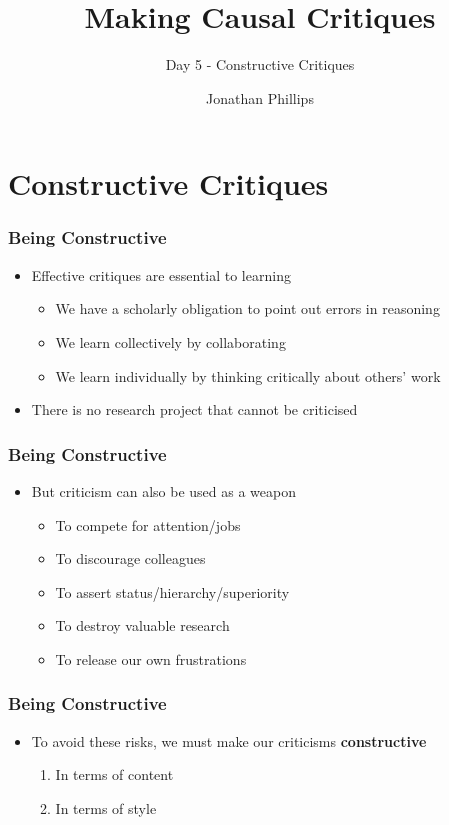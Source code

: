 \documentclass[xcolor=x11names,compress]{beamer}\usepackage[]{graphicx}\usepackage[]{color}
\title{Making Causal Critiques}
\subtitle{Day 5 - Constructive Critiques}
\author{Jonathan Phillips}
\renewcommand{\(}{\begin{columns}}
\renewcommand{\)}{\end{columns}}
\newcommand{\<}[1]{\begin{column}{#1}}
\renewcommand{\>}{\end{column}}
\begin{document}
\frame{\titlepage}

\section{Constructive Critiques}

\begin{frame}
\frametitle{Being Constructive}
\begin{itemize}
\item Effective critiques are essential to learning
\begin{itemize}
\item We have a scholarly obligation to point out errors in reasoning
\item We learn collectively by collaborating
\item We learn individually by thinking critically about others' work
\end{itemize}
\item There is no research project that cannot be criticised
\end{itemize}
\end{frame}

\begin{frame}
\frametitle{Being Constructive}
\begin{itemize}
\item But criticism can also be used as a weapon
\begin{itemize}
\item To compete for attention/jobs
\item To discourage colleagues
\item To assert status/hierarchy/superiority
\item To destroy valuable research
\item To release our own frustrations
\end{itemize}
\end{itemize}
\end{frame}

\begin{frame}
\frametitle{Being Constructive}
\begin{itemize}
\item To avoid these risks, we must make our criticisms \textbf{constructive}
\begin{enumerate}
\item In terms of content
\item In terms of style
\end{enumerate}
\end{itemize}
\end{frame}
\end{document}
